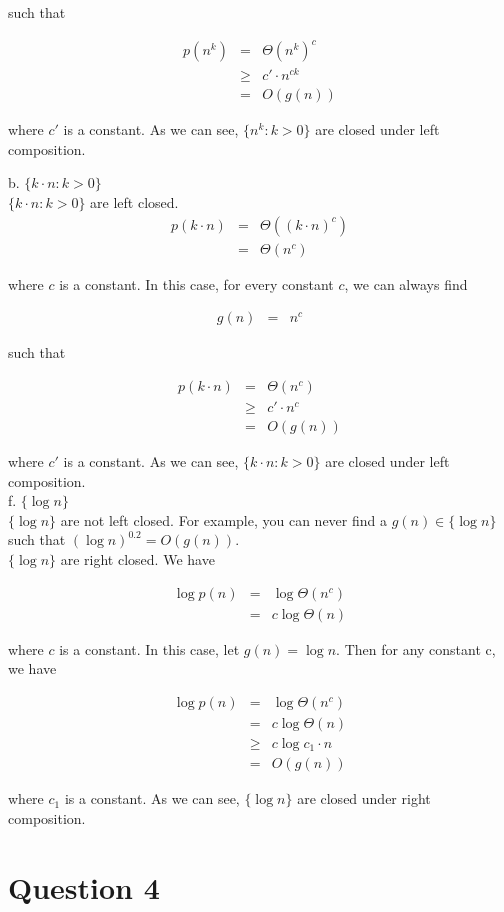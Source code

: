 \documentclass[12pt]{article}
\begin{document}
such that

\begin{eqnarray*}
  p(n^k) &=& \Theta {(n^k)^c} \\
  &\ge& c' \cdot n^{ck} \\
  &=& O(g(n))
\end{eqnarray*}

where $c'$ is a constant. As we can see, $\{ n^k : k > 0 \}$ are
closed under left composition.

b. $\{ k \cdot n : k > 0 \}$ \\
$\{ k \cdot n : k > 0 \}$ are left closed.
\begin{eqnarray*}
  p(k \cdot n) &=& \Theta {((k \cdot n)^c)} \\
  &=& \Theta {(n^c)}
\end{eqnarray*}

where $c$ is a constant. In this case, for every constant $c$, we can
always find

\begin{eqnarray*}
  g(n) &=& n^c
\end{eqnarray*}

such that 

\begin{eqnarray*}
  p(k \cdot n) &=& \Theta {(n^c)} \\
  &\ge& c' \cdot n^c \\
  &=& O(g(n))
\end{eqnarray*}

where $c'$ is a constant. As we can see, $\{ k \cdot n : k > 0 \}$ are
closed under left composition. \\

f. $\{\log {n} \}$ \\

$\{\log {n} \}$ are not left closed. For example, you can never find a
$g(n) \in \{\log {n} \}$ such that $(\log {n})^{0.2} = O(g(n))$. \\

$\{\log {n} \}$ are right closed. We have

\begin{eqnarray*}
  \log {p(n)} &=& \log {\Theta {(n^c)}} \\
  &=& c \log {\Theta {(n)}}
\end{eqnarray*}

where $c$ is a constant. In this case, let $g(n) = \log {n}$. Then for
any constant c, we have

\begin{eqnarray*}
  \log {p(n)} &=& \log {\Theta {(n^c)}} \\
  &=& c \log {\Theta {(n)}} \\
  &\ge& c \log {c_1 \cdot n}\\
  &=& O(g(n))
\end{eqnarray*}

where $c_1$ is a constant. As we can see, $\{\log {n} \}$ are
closed under right composition. \\

\section*{Question 4}
\end{document}
